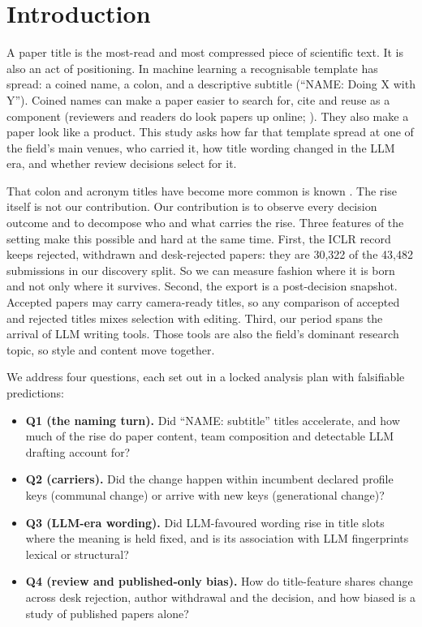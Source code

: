 \section{Introduction}
\label{sec:nt-intro}

A paper title is the most-read and most compressed piece of scientific text. It is also an act of positioning. In machine learning a recognisable template has spread: a coined name, a colon, and a descriptive subtitle (``NAME: Doing X with Y''). Coined names can make a paper easier to search for, cite and reuse as a component (reviewers and readers do look papers up online; \citealp{rastogi2022arxiv}). They also make a paper look like a product. This study asks how far that template spread at one of the field's main venues, who carried it, how title wording changed in the LLM era, and whether review decisions select for it.

That colon and acronym titles have become more common is known \citep{lewison2005whats,nelson2018colons,barnett2020growth,mandyam2026machine}. The rise itself is not our contribution. Our contribution is to observe every decision outcome and to decompose who and what carries the rise. Three features of the setting make this possible and hard at the same time. First, the ICLR record keeps rejected, withdrawn and desk-rejected papers: they are 30,322 of the 43,482 submissions in our discovery split. %
So we can measure fashion where it is born and not only where it survives. Second, the export is a post-decision snapshot. Accepted papers may carry camera-ready titles, so any comparison of accepted and rejected titles mixes selection with editing. Third, our period spans the arrival of LLM writing tools. Those tools are also the field's dominant research topic, so style and content move together.

We address four questions, each set out in a locked analysis plan with falsifiable predictions:
\begin{itemize}
\item \textbf{Q1 (the naming turn).} Did ``NAME: subtitle'' titles accelerate, and how much of the rise do paper content, team composition and detectable LLM drafting account for?
\item \textbf{Q2 (carriers).} Did the change happen within incumbent declared profile keys (communal change) or arrive with new keys (generational change)?
\item \textbf{Q3 (LLM-era wording).} Did LLM-favoured wording rise in title slots where the meaning is held fixed, and is its association with LLM fingerprints lexical or structural?
\item \textbf{Q4 (review and published-only bias).} How do title-feature shares change across desk rejection, author withdrawal and the decision, and how biased is a study of published papers alone?
\end{itemize}

